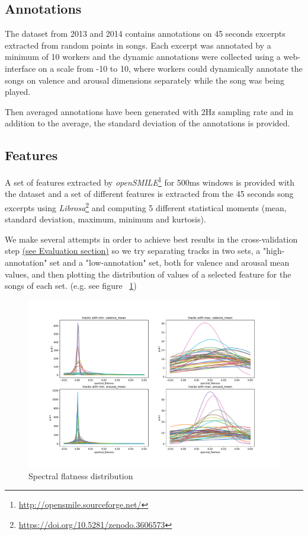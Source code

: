 \subsection{Annotations}

The dataset from 2013 and 2014 contains annotations on 45 seconds excerpts extracted from random points in songs. Each excerpt was annotated by a minimum of 10 workers and the dynamic annotations were collected using a web-interface on a scale from -10 to 10, where workers could dynamically annotate the songs on valence and arousal dimensions separately while the song was being played.~\cite{aljanaki2017developing}

Then averaged annotations have been generated with 2Hz sampling rate and in addition to the average, the standard deviation of the annotations is provided.~\cite{soleymani2016deam}


\subsection{Features}

A set of features extracted by \emph{openSMILE}\footnote{\url{http://opensmile.sourceforge.net/}} for 500ms windows is provided with the dataset and a set of different features is extracted from the 45 seconds song excerpts using \emph{Librosa}\footnote{\url{https://doi.org/10.5281/zenodo.3606573}} and computing 5 different statistical moments (mean, standard deviation, maximum, minimum and kurtosis).

We make several attempts in order to achieve best results in the cross-validation step \hyperref[sec:evaluation]{(see Evaluation section)} so we try separating tracks in two sets, a "high-annotation" set and a "low-annotation" set, both for valence and arousal mean values, and then plotting the distribution of values of a selected feature for the songs of each set. (e.g. see figure ~\ref{fig:va_mean-spectral_flatness-dists})

\begin{figure}[h]
	\centering
	\includegraphics[width=0.9\linewidth]{assets/va_mean-spectral_flatness-dists.pdf}
	\caption{Spectral flatness distribution}
	\label{fig:va_mean-spectral_flatness-dists}
\end{figure}

